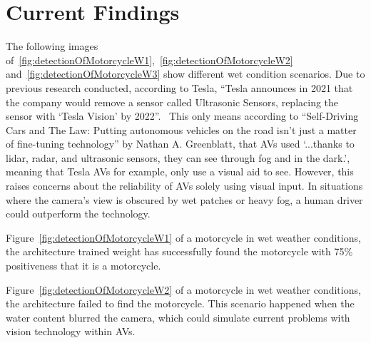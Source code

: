 \documentclass[conference]{IEEEtran}
\begin{document}
\section{Current Findings}
	The following images of~\ref{fig:detectionOfMotorcycleW1},~\ref{fig:detectionOfMotorcycleW2} and~\ref{fig:detectionOfMotorcycleW3} show different wet condition scenarios. Due to previous research conducted, according to Tesla, ``Tesla announces in 2021 that the company would remove a sensor called Ultrasonic Sensors, replacing the sensor with `Tesla Vision' by 2022''.~\cite{noauthor_tesla_nodate} This only means according to ``Self-Driving Cars and The Law: Putting autonomous vehicles on the road isn't just a matter of fine-tuning technology'' by Nathan A. Greenblatt, that AVs used `...thanks to lidar, radar, and ultrasonic sensors, they can see through fog and in the dark.', meaning that Tesla AVs for example, only use a visual aid to see. However, this raises concerns about the reliability of AVs solely using visual input. In situations where the camera's view is obscured by wet patches or heavy fog, a human driver could outperform the technology.

	Figure~\ref{fig:detectionOfMotorcycleW1} of a motorcycle in wet weather conditions, the architecture trained weight has successfully found the motorcycle with 75\% positiveness that it is a motorcycle.

	Figure~\ref{fig:detectionOfMotorcycleW2} of a motorcycle in wet weather conditions, the architecture failed to find the motorcycle. This scenario happened when the water content blurred the camera, which could simulate current problems with vision technology within AVs.
\end{document}
